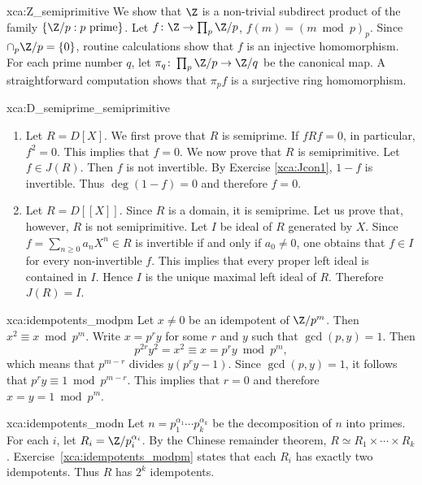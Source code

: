 \begin{sol}{xca:Z_semiprimitive}
    We show that $\Z$ is a non-trivial subdirect product of the family $\{\Z/p:p\text{ prime}\}$. 
    Let $f\colon\Z\to \prod_{p}\Z/p$, $f(m)=(m\bmod p)_{p}$. Since $\cap_p\Z/p=\{0\}$, routine calculations show that 
    $f$ is an injective homomorphism. For each prime number $q$, let $\pi_q\colon\prod_{p}\Z/p\to\Z/q$ be the canonical map. A straightforward computation 
    shows that 
    $\pi_pf$ is a surjective ring homomorphism. 
\end{sol}

\begin{sol}{xca:D_semiprime_semiprimitive}
\begin{enumerate}
    \item Let $R=D[X]$. We first prove that $R$ is semiprime. If $fRf=0$, in particular, 
    $f^2=0$. This implies that $f=0$. 
    We now prove that $R$ is semiprimitive. Let $f\in J(R)$. Then $f$ is not invertible. By Exercise \ref{xca:Jcon1}, $1-f$ is invertible. Thus $\deg(1-f)=0$ and therefore
    $f=0$. 

    \item Let $R=D[\![X]\!]$. Since $R$ is a domain, 
    it is semiprime. Let us prove that, however, $R$ is not
    semiprimitive. Let $I$ be ideal of $R$ 
    generated by $X$. 
    Since $f=\sum_{n\geq0}a_nX^n\in R$ is invertible if and only 
    if $a_0\ne 0$, one obtains that $f\in I$ for every non-invertible $f$. 
    This implies
    that every proper left ideal is contained in $I$. Hence 
    $I$ is the unique maximal left ideal of $R$. Therefore 
    $J(R)=I$. 
    \end{enumerate}
\end{sol}


\begin{sol}{xca:idempotents_modpm}
    Let $x\ne 0$ be an idempotent of $\Z/p^m$. Then $x^2\equiv x\bmod p^m$. 
    Write $x=p^ry$ for some $r$ and $y$ such that $\gcd(p,y)=1$. Then 
    \[
    p^{2r}y^2=x^2\equiv x=p^ry\bmod p^m,
    \]
    which means that $p^{m-r}$ divides $y(p^ry-1)$. Since 
    $\gcd(p,y)=1$, it follows that 
    $p^ry\equiv 1\bmod p^{m-r}$. This implies that $r=0$ and 
    therefore $x=y=1\bmod p^m$.
\end{sol}

\begin{sol}{xca:idempotents_modn}
    Let $n=p_1^{\alpha_1}\cdots p_k^{\alpha_k}$ be the decomposition 
    of $n$ into primes. For each $i$, let $R_i=\Z/p_i^{\alpha_i}$. By the 
    Chinese remainder theorem, $R\simeq R_1\times\cdots\times R_k$. Exercise~\ref{xca:idempotents_modpm} states that each $R_i$ has exactly  
    two idempotents. Thus $R$ has $2^k$ idempotents. 
\end{sol}

